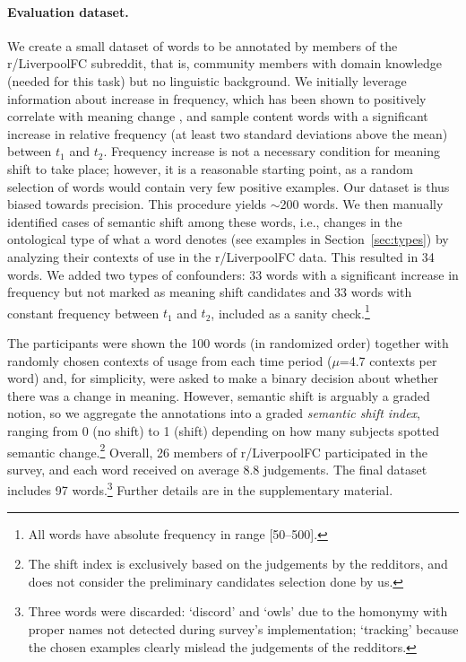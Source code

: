 \paragraph{Evaluation dataset.}

We create a small dataset of words to be annotated by members of the r/LiverpoolFC
subreddit, that is, community members with domain knowledge (needed for this task) but no linguistic background.
We initially leverage information about increase in frequency, which has been shown to positively correlate with meaning change \cite{wijaya2011understanding,kulkarni2015statistically}, and sample content words with a significant increase in relative frequency (at least two standard deviations above the mean) between $t_1$ and $t_2$. Frequency increase is not a necessary condition for meaning shift to take place; however, it is a reasonable starting point, as a random selection of words would contain very few positive examples. Our dataset is thus biased towards precision. 
This procedure yields $\sim$200 words. We then manually identified cases of semantic shift among these words, i.e., changes in the ontological type of what a word denotes (see examples in Section~\ref{sec:types}) by analyzing their contexts of use in the r/LiverpoolFC data. This resulted in 34 words. We added two types of confounders: 33 words with a significant increase in frequency but not marked as meaning shift candidates and 33 words with constant frequency between $t_1$ and $t_2$, included as a sanity check.\footnote{All words have absolute frequency in range [50--500].} 

The participants were shown the 100 words (in randomized order) together with randomly chosen contexts of usage from each time period ($\mu$=4.7 contexts per word) and, for simplicity, were asked to make a binary decision
about whether there was a change in meaning. However, semantic shift is arguably a graded notion, so we aggregate the annotations into a graded \emph{semantic shift index}, ranging from 0 (no shift) to 1 (shift) depending on how many subjects spotted semantic change.\footnote{The shift index is exclusively based on the judgements by the redditors, and does not consider the preliminary candidates selection done by us.}  Overall, 26 members of r/LiverpoolFC participated in the survey, and each word received on average 8.8 judgements. The final dataset includes 97 words.\footnote{Three words were discarded: `discord'  and `owls' due to the homonymy with proper names not detected during survey's implementation; `tracking' because the chosen examples clearly mislead the judgements of the redditors.} 
Further details are in the supplementary material.


